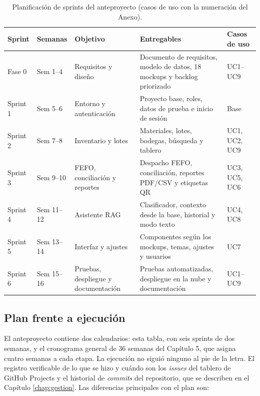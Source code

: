 \begin{table}[!htbp]
\centering
\caption{Planificación de sprints del anteproyecto (casos de uso con la numeración del Anexo).}
\label{tab:sprints}
\begin{tabular}{|l|l|p{3.4cm}|p{6.3cm}|p{2.1cm}|}
\hline
\textbf{Sprint} & \textbf{Semanas} & \textbf{Objetivo} & \textbf{Entregables} & \textbf{Casos de uso} \\
\hline
Fase 0 & Sem 1--4 & Requisitos y diseño & Documento de requisitos, modelo de datos, 18 mockups y backlog priorizado & UC1--UC9 \\
\hline
Sprint 1 & Sem 5--6 & Entorno y autenticación & Proyecto base, roles, datos de prueba e inicio de sesión & Base \\
\hline
Sprint 2 & Sem 7--8 & Inventario y lotes & Materiales, lotes, bodegas, búsqueda y tablero & UC1, UC2, UC9 \\
\hline
Sprint 3 & Sem 9--10 & FEFO, conciliación y reportes & Despacho FEFO, conciliación, reportes PDF/CSV y etiquetas QR & UC3, UC5, UC6 \\
\hline
Sprint 4 & Sem 11--12 & Asistente RAG & Clasificador, contexto desde la base, historial y modo texto & UC4, UC8 \\
\hline
Sprint 5 & Sem 13--14 & Interfaz y ajustes & Componentes según los mockups, temas, ajustes y usuarios & UC7 \\
\hline
Sprint 6 & Sem 15--16 & Pruebas, despliegue y documentación & Pruebas automatizadas, despliegue en la nube y documentación & UC1--UC9 \\
\hline
\end{tabular}
\end{table}

\subsection{Plan frente a ejecución}

El anteproyecto contiene dos calendarios: esta tabla, con seis sprints de dos semanas, y el cronograma general de 36 semanas del Capítulo 5, que asigna cuatro semanas a cada etapa. La ejecución no siguió ninguno al pie de la letra. El registro verificable de lo que se hizo y cuándo son los \textit{issues} del tablero de GitHub Projects y el historial de \textit{commits} del repositorio, que se describen en el Capítulo \ref{chap:gestion}. Las diferencias principales con el plan son:

